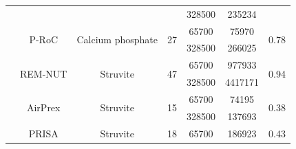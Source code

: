 \documentclass[authoryear]{elsarticle}
\begin{document}
\begin{table}[h]
{\begin{tabular}{@{}ccccccc@{}}
			&       &                    &                                                                                     & 328500                                                         & 235234                                                      &                                    \\
			& \multirow{2}{*}{P-RoC}             & \multirow{2}{*}{Calcium phosphate}          & \multirow{2}{*}{27}                                                                                    & 65700                                                          & 75970                                                       & \multirow{2}{*}{0.78}  \\
			&          &           &                                                                                     & 328500                                                         & 266025                                                      &                                    \\
			& \multirow{2}{*}{REM-NUT}           & \multirow{2}{*}{Struvite}                   & \multirow{2}{*}{47}                                                                                    & 65700                                                          & 977933                                                      & \multirow{2}{*}{0.94} \\
			&            &                    &                                                                                     & 328500                                                         & 4417171                                                     &                                    \\
			& \multirow{2}{*}{AirPrex}           & \multirow{2}{*}{Struvite}                  & \multirow{2}{*}{15}                                                                                    & 65700                                                          & 74195                                                       & \multirow{2}{*}{0.38}  \\
			&            &                    &                                                                                     & 328500                                                         & 137693                                                      &                                    \\
			& \multirow{2}{*}{PRISA}             & \multirow{2}{*}{Struvite}                   & \multirow{2}{*}{18}                                                                                   & 65700                                                          & 186923                                                      & \multirow{2}{*}{0.43} \\

\end{tabular}}
\end{table}
\end{document}
